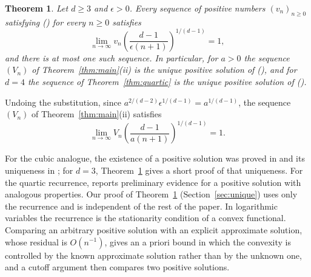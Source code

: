 \documentclass[twoside,10pt]{article}
\numberwithin{equation}{section}
\theoremstyle{slbody}
\newtheorem{theorem}{Theorem}[section]
\theoremstyle{remark}
\renewcommand{\eqref}[1]{%
  \textup{{\normalfont(\oldstylenums{\ref{#1}}}\normalfont)}}
\begin{document}
\begin{theorem}\label{thm:unique}
Let \(d\geq3\) and \(\epsilon>0\).  Every sequence of positive numbers
\((v_n)_{n\geq0}\) satisfying \eqref{eq:general-recurrence} for every
\(n\geq0\) satisfies
\[
\lim_{n\to\infty}v_n\left(\frac{d-1}{\epsilon(n+1)}\right)^{1/(d-1)}=1,
\]
and there is at most one such sequence.  In particular, for \(a>0\) the
sequence \((V_n)\) of Theorem~\ref{thm:main}(ii) is the unique positive
solution of \eqref{eq:FH-recurrence}, and for \(d=4\) the sequence of
Theorem~\ref{thm:quartic} is the unique positive solution of
\eqref{eq:quartic-recurrence}.
\end{theorem}

Undoing the substitution, since \(a^{2/(d-2)}\epsilon^{1/(d-1)}=a^{1/(d-1)}\),
the sequence \((V_n)\) of Theorem~\ref{thm:main}(ii) satisfies
\[
\lim_{n\to\infty}V_n\left(\frac{d-1}{a(n+1)}\right)^{1/(d-1)}=1 .
\]

For the cubic analogue, the existence of a positive solution was
proved in \cite[Section~7]{ArnlindHoppeKontsevich2019} and its
uniqueness in \cite[Theorem~2.1, proved in Section~4.2]{ClarksonEtAl2025};
for \(d=3\), Theorem~\ref{thm:unique} gives a short proof of that
uniqueness.  For the quartic recurrence, \cite[Section~5]{ClarksonEtAl2025}
reports preliminary evidence for a positive solution with analogous
properties.  Our proof of Theorem~\ref{thm:unique}
(Section~\ref{sec:unique}) uses only the recurrence and is independent of
the rest of the paper.  In logarithmic variables the recurrence is the
stationarity condition of a convex functional.  Comparing an arbitrary
positive solution with an explicit approximate solution, whose residual
is \(O(n^{-1})\), gives an a priori bound in which the convexity is
controlled by the known approximate solution rather than by the unknown
one, and a cutoff argument then compares two positive solutions.
\end{document}
